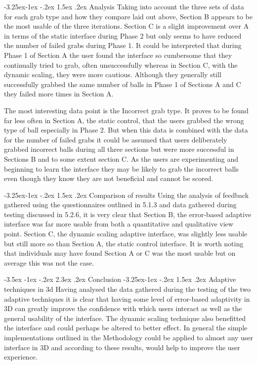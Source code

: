 \documentclass[12pt]{article}
\makeatletter
\renewcommand{\section}{\@startsection {section}{1}{\z@}%
             {-3.5ex \@plus -1ex \@minus -.2ex}%
             {2.3ex \@plus .2ex}%
             {\normalfont\Large\scshape\bfseries}}
\renewcommand{\subsection}{\@startsection{subsection}{2}{\z@}%
             {-3.25ex\@plus -1ex \@minus -.2ex}%
             {1.5ex \@plus .2ex}%
             {\normalfont\large\scshape\bfseries}}
\renewcommand{\subsubsection}{\@startsection{subsubsection}{2}{\z@}%
             {-3.25ex\@plus -1ex \@minus -.2ex}%
             {1.5ex \@plus .2ex}%
             {\normalfont\normalsize\scshape\bfseries}}
\makeatother
\begin{document}
\subsubsection{Analysis}
Taking into account the three sets of data for each grab type and how they compare laid out above, Section B appears to be the most usable of the three iterations. Section C is a slight improvement over A in terms of the static interface during Phase 2 but only seems to have reduced the number of failed grabs during Phase 1. It could be interpreted that during Phase 1 of Section A the user found the interface so cumbersome that they continually tried to grab, often unsuccessfully whereas in Section C, with the dynamic scaling, they were more cautious. Although they generally still successfully grabbed the same number of balls in Phase 1 of Sections A and C they failed more times in Section A.

The most interesting data point is the Incorrect grab type. It proves to be found far less often in Section A, the static control, that the users grabbed the wrong type of ball especially in Phase 2. But when this data is combined with the data for the number of failed grabs it could be assumed that users deliberately grabbed incorrect balls during all three sections but were more successful in Sections B and to some extent section C. As the users are experimenting and beginning to learn the interface they may be likely to grab the incorrect balls even though they know they are not beneficial and cannot be scored. 

\subsection{Comparison of results}
Using the analysis of feedback gathered using the questionnaires outlined in 5.1.3 and data gathered during testing discussed in 5.2.6, it is very clear that Section B, the error-based adaptive interface was far more usable from both a quantitative and qualitative view point. Section C, the dynamic scaling adaptive interface, was slightly less usable but still more so than Section A, the static control interface. It is worth noting that individuals may have found Section A or C was the most usable but on average this was not the case.

\section{Conclusion}
\subsection{Adaptive techniques in 3d}
Having analysed the data gathered during the testing of the two adaptive techniques it is clear that having some level of error-based adaptivity in 3D can greatly improve the confidence with which users interact as well as the general usability of the interface. The dynamic scaling technique also benefitted the interface and could perhaps be altered to better effect. In general the simple implementations outlined in the Methodology could be applied to almost any user interface in 3D and according to these results, would help to improve the user experience.
\end{document}
